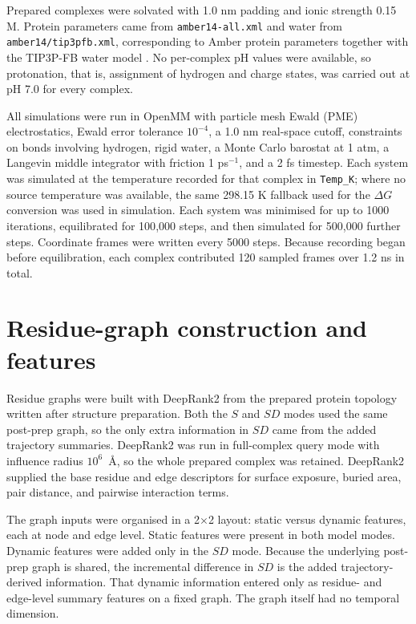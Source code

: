 Prepared complexes were solvated with 1.0 nm padding and ionic strength 0.15 M. Protein parameters came from \texttt{amber14-all.xml} and water from \texttt{amber14/tip3pfb.xml}, corresponding to Amber protein parameters together with the TIP3P-FB water model \citep{Maier2015ff14SB,Wang2014WaterModels}. No per-complex pH values were available, so protonation, that is, assignment of hydrogen and charge states, was carried out at pH 7.0 for every complex.

All simulations were run in OpenMM \citep{Eastman2024OpenMM8} with particle mesh Ewald (PME) electrostatics, Ewald error tolerance $10^{-4}$, a 1.0 nm real-space cutoff, constraints on bonds involving hydrogen, rigid water, a Monte Carlo barostat at 1 atm, a Langevin middle integrator with friction 1 ps$^{-1}$, and a 2 fs timestep. Each system was simulated at the temperature recorded for that complex in \texttt{Temp\_K}; where no source temperature was available, the same 298.15 K fallback used for the $\Delta G$ conversion was used in simulation. Each system was minimised for up to 1000 iterations, equilibrated for 100{,}000 steps, and then simulated for 500{,}000 further steps. Coordinate frames were written every 5000 steps. Because recording began before equilibration, each complex contributed 120 sampled frames over 1.2 ns in total.

\section{Residue-graph construction and features}

Residue graphs were built with DeepRank2 \citep{Crocioni2024DeepRank2} from the prepared protein topology written after structure preparation. Both the $S$ and $SD$ modes used the same post-prep graph, so the only extra information in $SD$ came from the added trajectory summaries. DeepRank2 was run in full-complex query mode with influence radius $10^6$~\AA, so the whole prepared complex was retained. DeepRank2 supplied the base residue and edge descriptors for surface exposure, buried area, pair distance, and pairwise interaction terms.

The graph inputs were organised in a 2$\times$2 layout: static versus dynamic features, each at node and edge level. Static features were present in both model modes. Dynamic features were added only in the $SD$ mode. Because the underlying post-prep graph is shared, the incremental difference in $SD$ is the added trajectory-derived information. That dynamic information entered only as residue- and edge-level summary features on a fixed graph. The graph itself had no temporal dimension.

